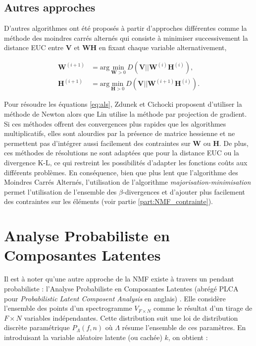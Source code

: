 \subsection{Autres approches}

D'autres algorithmes ont été proposés à partir d'approches différentes comme la méthode des moindres carrés alternés \cite{cichocki_regularized_2007, berry_algorithms_2007} qui consiste à minimiser successivement la distance EUC entre $\mathbf{V}$ et $\mathbf{WH}$ en fixant chaque variable alternativement,

\begin{subequations}\label{eq:als}
\begin{align}
\mathbf{W}^{(i+1)} &= \text{arg}~\underset{\mathbf{W} > 0}{\text{min}}~D\left(\mathbf{V} \vert\vert\mathbf{W}^{(i)}\mathbf{H}^{(i)}\right),\\
\mathbf{H}^{(i+1)} &= \text{arg}~\underset{\mathbf{H} > 0}{\text{min}}~D\left(\mathbf{V} \vert\vert\mathbf{W}^{(i+1)}\mathbf{H}^{(i)}\right).
\end{align}
\end{subequations}

Pour résoudre les équations \ref{eq:als}, Zdunek et Cichocki \cite{zdunek2006non} proposent d'utiliser la méthode de Newton alors que Lin \cite{lin_projected_2007} utilise la méthode par projection de gradient. Si ces méthodes offrent des convergences plus rapides que les algorithmes multiplicatifs, elles sont alourdies par la présence de matrice hessienne et ne permettent pas d'intégrer aussi facilement des contraintes sur $\mathbf{W}$ ou $\mathbf{H}$. De plus, ces méthodes de résolutions ne sont adaptées que pour la distance EUC ou la divergence K-L, ce qui restreint les possibilités d'adapter les fonctions coûts aux différents problèmes. En conséquence, bien que plus lent que l'algorithme des Moindres Carrés Alternés, l'utilisation de l'algorithme \textit{majorisation-minimisation} permet l'utilisation de l'ensemble des $\beta$-divergences et d'ajouter plus facilement des contraintes sur les éléments (voir partie \ref{part:NMF_contrainte}).

\section{Analyse Probabiliste en Composantes Latentes}

Il est à noter qu'une autre approche de la NMF existe à travers un pendant probabiliste : l'Analyse Probabiliste en Composantes Latentes (abrégé PLCA pour \textit{Probabilistic Latent Composent Analysis} en anglais) \cite{hofmann_unsupervised_2001, cazau_understanding_2017}. Elle considère l'ensemble des points d'un spectrogramme $V_{F \times N}$ comme le résultat d'un tirage de $F \times N$ variables indépendantes.  Cette distribution suit une loi de distribution discrète paramétrique $P_{\Lambda}\left(f,n\right)$ où $\Lambda$ résume l'ensemble de ces paramètres. En introduisant la variable aléatoire latente (ou cachée) $k$, on obtient :


